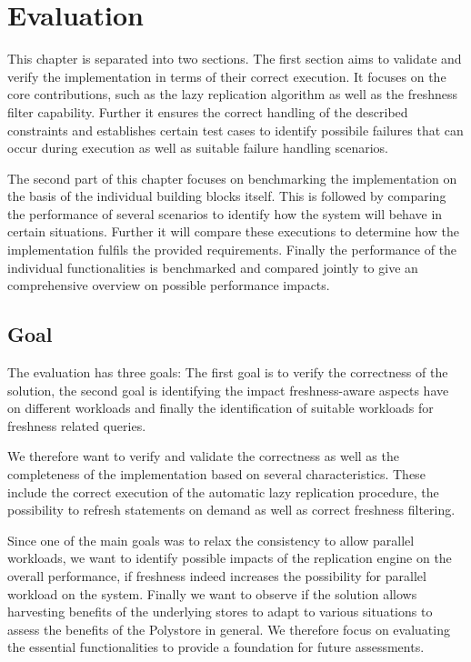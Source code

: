 \chapter{Evaluation}
\label{c:evaluation}

This chapter is separated into two sections. The first section aims to validate and verify the implementation in terms of their
correct execution. It focuses on the core contributions, such as the lazy replication algorithm as well as the freshness filter capability.
Further it ensures the correct handling of the described constraints and establishes certain test cases to identify possibile failures that can occur 
during execution as well as suitable failure handling scenarios.

The second part of this chapter focuses on benchmarking the implementation on the basis of the individual building blocks itself.
This is followed by comparing the performance of several scenarios to identify how the system will behave in certain situations.
Further it will compare these executions to determine how the implementation fulfils the provided requirements.
Finally the performance of the individual functionalities is benchmarked and compared jointly to give an comprehensive overview on possible performance impacts.


\section{Goal}
The evaluation has three goals: The first goal is to verify the correctness of the solution, the second goal
is identifying the impact freshness-aware aspects have on different workloads and finally the identification of suitable workloads for freshness related queries.

We therefore want to verify and validate the correctness as well as the completeness of the implementation based on several characteristics.
These include the correct execution of the automatic lazy replication procedure, the possibility to refresh statements on demand as well as correct freshness filtering.

Since one of the main goals was to relax the consistency to allow parallel workloads,
we want to identify possible impacts of the replication engine on the overall performance, if freshness indeed increases the possibility
for parallel workload on the system. 
Finally we want to observe if the solution allows harvesting benefits of the underlying stores to adapt to various situations
to assess the benefits of the Polystore in general.
We therefore focus on evaluating the essential functionalities to provide a foundation for future assessments.


